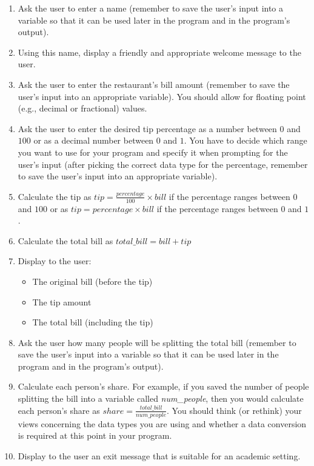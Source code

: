 \documentclass[11pt]{article}
\begin{document}
\vspace*{-.1in}
\begin{enumerate}

  \item Ask the user to enter a name (remember to save the user's input into a
    variable so that it can be used later in the program and in the program's
    output).

  \item Using this name, display a friendly and appropriate welcome message to
    the user.

  \item Ask the user to enter the restaurant's bill amount (remember to save the
    user's input into an appropriate variable). You should allow for floating
    point (e.g., decimal or fractional) values.

  \item Ask the user to enter the desired tip percentage as a number between $0$
    and $100$ or as a decimal number between $0$ and $1$. You have to decide
    which range you want to use for your program and specify it when prompting
    for the user's input (after picking the correct data type for the
    percentage, remember to save the user's input into an appropriate variable).

  \item Calculate the tip as $tip = \frac{percentage}{100} \times bill$ if the
    percentage ranges between $0$ and $100$ or as $tip = percentage \times bill$
    if the percentage ranges between $0$ and $1$.

  \item Calculate the total bill as $total\_bill = bill+tip$

  \item Display to the user:
    \begin{itemize}
      \item The original bill (before the tip)
      \item The tip amount
      \item The total bill (including the tip)
    \end{itemize}

  \item Ask the user how many people will be splitting the total bill (remember
    to save the user's input into a variable so that it can be used later in the
    program and in the program's output).

  \item Calculate each person's share. For example, if you saved the number of
    people splitting the bill into a variable called {\em num\_people}, then you
    would calculate each person's share as $share =
    \frac{total\_bill}{num\_people}$. You should think (or rethink) your views
    concerning the data types you are using and whether a data conversion is
    required at this point in your program.

  \item Display to the user an exit message that is suitable for an academic
    setting.

\end{enumerate}
\end{document}
